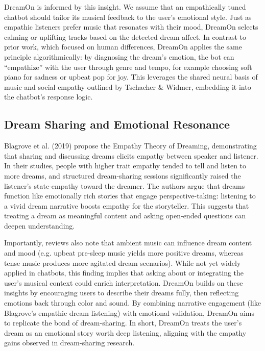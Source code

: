 \documentclass[conference]{IEEEtran}
\begin{document}
    DreamOn is informed by this insight. We assume that an empathically tuned chatbot should tailor its musical feedback to the user’s emotional style. Just as empathic listeners prefer music that resonates with their mood, DreamOn selects calming or uplifting tracks based on the detected dream affect. In contrast to prior work, which focused on human differences, DreamOn applies the same principle algorithmically: by diagnosing the dream’s emotion, the bot can “empathize” with the user through genre and tempo, for example choosing soft piano for sadness or upbeat pop for joy. This leverages the shared neural basis of music and social empathy outlined by Tschacher \& Widmer, embedding it into the chatbot’s response logic.

    \subsection{Dream Sharing and Emotional Resonance}
    Blagrove et al. (2019) propose the Empathy Theory of Dreaming, demonstrating that sharing and discussing dreams elicits empathy between speaker and listener. In their studies, people with higher trait empathy tended to tell and listen to more dreams, and structured dream-sharing sessions significantly raised the listener’s state-empathy toward the dreamer. The authors argue that dreams function like emotionally rich stories that engage perspective-taking: listening to a vivid dream narrative boosts empathy for the storyteller. This suggests that treating a dream as meaningful content and asking open-ended questions can deepen understanding.

    Importantly, reviews also note that ambient music can influence dream content and mood (e.g. upbeat pre-sleep music yields more positive dreams, whereas tense music produces more agitated dream scenarios). While not yet widely applied in chatbots, this finding implies that asking about or integrating the user’s musical context could enrich interpretation. DreamOn builds on these insights by encouraging users to describe their dreams fully, then reflecting emotions back through color and sound. By combining narrative engagement (like Blagrove’s empathic dream listening) with emotional validation, DreamOn aims to replicate the bond of dream-sharing. In short, DreamOn treats the user’s dream as an emotional story worth deep listening, aligning with the empathy gains observed in dream-sharing research.
\end{document}
